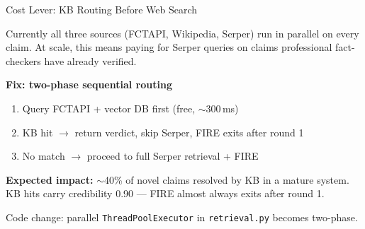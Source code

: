 \documentclass[11pt, aspectratio=169]{beamer}
\begin{document}
\begin{frame}{Cost Lever: KB Routing Before Web Search}

  Currently all three sources (FCTAPI, Wikipedia, Serper) run in parallel on every claim.
  At scale, this means paying for Serper queries on claims professional fact-checkers have already verified.

  \bigskip
  \textbf{Fix: two-phase sequential routing}
  \begin{enumerate}\setlength{\itemsep}{8pt}
    \item Query FCTAPI + vector DB first {\small (free, $\sim$300\,ms)}
    \item KB hit $\to$ return verdict, skip Serper, FIRE exits after round 1
    \item No match $\to$ proceed to full Serper retrieval + FIRE
  \end{enumerate}

  \bigskip
  \textbf{Expected impact:} $\sim$40\% of novel claims resolved by KB in a mature system.
  KB hits carry credibility 0.90 — FIRE almost always exits after round 1.

  \bigskip
  {\small\textcolor{slate}{Code change: parallel \texttt{ThreadPoolExecutor} in \texttt{retrieval.py} becomes two-phase.}}
\end{frame}
\end{document}
